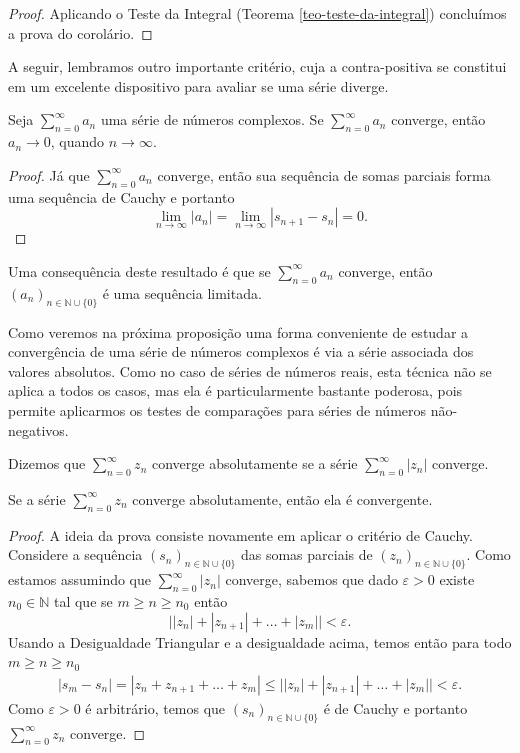\begin{proof}
Aplicando o Teste da Integral (Teorema \ref{teo-teste-da-integral}) concluímos a prova do corolário.
\end{proof}


\bigskip 
A seguir, lembramos outro importante critério, cuja a contra-positiva se constitui 
em um excelente dispositivo para avaliar se uma série diverge.


\begin{proposicao}\label{prop-conv-term-geral-vai-zero}
Seja $\sum_{n=0}^{\infty} a_n$ uma série de números complexos. 
Se $\sum_{n=0}^{\infty}a_n$ converge, então $a_n\to 0$, quando $n\to\infty$.
\end{proposicao}

\begin{proof}
Já que $\sum_{n=0}^{\infty} a_n$ converge, então sua sequência de somas parciais
forma uma sequência de Cauchy e portanto 
\[
\lim_{n\to\infty} |a_n| = \lim_{n\to\infty} |s_{n+1}-s_n| = 0.
\]
\end{proof}

Uma consequência deste resultado é que se $\sum_{n=0}^{\infty}a_n$
converge, então $(a_n)_{n\in\mathbb{N}\cup\{0\}}$ é uma sequência limitada.

Como veremos na próxima proposição uma 
forma conveniente de estudar a convergência de uma série de números complexos é 
via a série associada dos valores absolutos. Como no caso de séries de números 
reais, esta técnica não se aplica a todos os casos, mas ela é particularmente 
bastante poderosa, pois permite aplicarmos os testes de comparações para 
séries de números não-negativos.


\begin{definicao}
\label{def-conv-absoluta}
Dizemos que $\sum_{n=0}^{\infty} z_n$ converge absolutamente se a série 
$\sum_{n=0}^{\infty}|z_n|$ converge. 
\end{definicao}

\begin{proposicao}\label{prop-conv-abs-implica-conv}
Se a série $\sum_{n=0}^{\infty} z_n$ converge absolutamente, então 
ela é convergente.
\end{proposicao}


\begin{proof}
A ideia da prova consiste novamente em aplicar o critério de Cauchy.
Considere a sequência $(s_n)_{n\in\mathbb{N}\cup\{0\}}$ 
das somas parciais de $(z_n)_{n\in\mathbb{N}\cup\{0\}}$.
Como estamos assumindo que $\sum_{n=0}^{\infty} |z_n|$ converge, 
sabemos que dado $\varepsilon>0$ existe $n_0\in\mathbb{N}$ tal que 
se $m \geqslant n\geqslant n_0$ então 
\[
\Big| |z_n|+|z_{n+1}| +\ldots +|z_m|  \Big|<\varepsilon.
\]
Usando a Desigualdade Triangular e a desigualdade acima, temos
então para todo $m\geqslant n \geqslant n_0$
\begin{align*}
|s_{m}-s_n| = |z_{n}+z_{n+1}+\ldots+ z_{m}|
\leqslant  
\Big| |z_n|+|z_{n+1}| +\ldots +|z_m|  \Big|<\varepsilon.
\end{align*}
Como $\varepsilon>0$ é arbitrário, 
temos que $(s_n)_{n\in\mathbb{N}\cup\{0\}}$ é de Cauchy e portanto 
$\sum_{n=0}^{\infty} z_n$ converge.
\end{proof}


